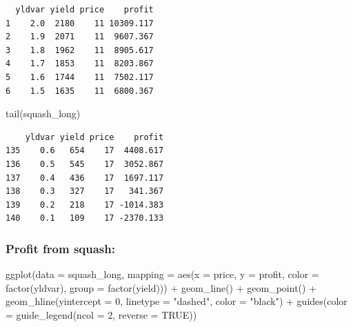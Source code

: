 \documentclass[
  letterpaper,
  DIV=11,
  numbers=noendperiod]{scrartcl}
\newenvironment{Shaded}{\begin{snugshade}}{\end{snugshade}}
\newcommand{\AttributeTok}[1]{\textcolor[rgb]{0.40,0.45,0.13}{#1}}
\newcommand{\ConstantTok}[1]{\textcolor[rgb]{0.56,0.35,0.01}{#1}}
\newcommand{\DecValTok}[1]{\textcolor[rgb]{0.68,0.00,0.00}{#1}}
\newcommand{\FunctionTok}[1]{\textcolor[rgb]{0.28,0.35,0.67}{#1}}
\newcommand{\NormalTok}[1]{\textcolor[rgb]{0.00,0.23,0.31}{#1}}
\newcommand{\SpecialCharTok}[1]{\textcolor[rgb]{0.37,0.37,0.37}{#1}}
\newcommand{\StringTok}[1]{\textcolor[rgb]{0.13,0.47,0.30}{#1}}
\begin{document}
\begin{verbatim}
  yldvar yield price    profit
1    2.0  2180    11 10309.117
2    1.9  2071    11  9607.367
3    1.8  1962    11  8905.617
4    1.7  1853    11  8203.867
5    1.6  1744    11  7502.117
6    1.5  1635    11  6800.367
\end{verbatim}

\begin{Shaded}
\begin{Highlighting}[]
\FunctionTok{tail}\NormalTok{(squash\_long)}
\end{Highlighting}
\end{Shaded}

\begin{verbatim}
    yldvar yield price    profit
135    0.6   654    17  4408.617
136    0.5   545    17  3052.867
137    0.4   436    17  1697.117
138    0.3   327    17   341.367
139    0.2   218    17 -1014.383
140    0.1   109    17 -2370.133
\end{verbatim}

\subsubsection{Profit from squash:}\label{profit-from-squash}

\begin{Shaded}
\begin{Highlighting}[]
\FunctionTok{ggplot}\NormalTok{(}\AttributeTok{data =}\NormalTok{ squash\_long,}
       \AttributeTok{mapping =} \FunctionTok{aes}\NormalTok{(}\AttributeTok{x =}\NormalTok{ price,}
                     \AttributeTok{y =}\NormalTok{ profit,}
                     \AttributeTok{color =} \FunctionTok{factor}\NormalTok{(yldvar),}
                     \AttributeTok{group =} \FunctionTok{factor}\NormalTok{(yield))) }\SpecialCharTok{+}
  \FunctionTok{geom\_line}\NormalTok{() }\SpecialCharTok{+}
  \FunctionTok{geom\_point}\NormalTok{() }\SpecialCharTok{+}
  \FunctionTok{geom\_hline}\NormalTok{(}\AttributeTok{yintercept =} \DecValTok{0}\NormalTok{,}
             \AttributeTok{linetype =} \StringTok{"dashed"}\NormalTok{,}
             \AttributeTok{color =} \StringTok{"black"}\NormalTok{) }\SpecialCharTok{+}
  \FunctionTok{guides}\NormalTok{(}\AttributeTok{color =} \FunctionTok{guide\_legend}\NormalTok{(}\AttributeTok{ncol =} \DecValTok{2}\NormalTok{, }
                              \AttributeTok{reverse =} \ConstantTok{TRUE}\NormalTok{))}
\end{Highlighting}
\end{Shaded}
\end{document}
